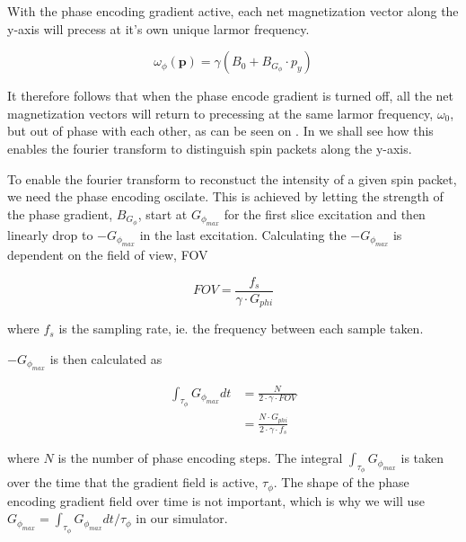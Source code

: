 With the phase encoding gradient active, each net magnetization vector
along the y-axis will precess at it's own unique larmor frequency. 

\begin{displaymath}
  \omega_\phi(\mathbf{p}) = \gamma (B_0 + B_{G_\phi} \cdot p_y)
\end{displaymath}

It therefore follows that when the phase encode gradient is turned
off, all the net magnetization vectors will return to precessing at
the same larmor frequency, $\omega_0$, but out of phase with each
other, as can be seen on . In
 we shall see how this enables the fourier
transform to distinguish spin packets along the y-axis.

To enable the fourier transform to reconstuct the intensity of a given
spin packet, we need the phase encoding oscilate. This is achieved by
letting the strength of the phase gradient, $B_{G_\phi}$, start at
$G_{\phi_{max}}$ for the first slice excitation and then linearly drop
to $-G_{\phi_{max}}$ in the last excitation. Calculating the
$-G_{\phi_{max}}$ is dependent on the field of view, FOV

\begin{displaymath}
  FOV = \frac{f_s}{\gamma \cdot G_{phi}}
\end{displaymath}

where $f_s$ is the sampling rate, ie. the frequency between each
sample taken.

$-G_{\phi_{max}}$ is then calculated as

\begin{displaymath}
  \begin{array}{rl}
    \int_{\tau_\phi} G_{\phi_{max}} dt &= \frac{N}{2 \cdot \gamma \cdot FOV}\\
    &= \frac{N \cdot G_{phi}}{2 \cdot \gamma \cdot f_s}
  \end{array}
\end{displaymath}

where $N$ is the number of phase encoding steps. The integral
$\int_{\tau_\phi} G_{\phi_{max}}$ is taken over the time that the
gradient field is active, $\tau_\phi$. The shape of the phase encoding
gradient field over time is not important, which is why we will use
$G_{\phi_{max}} = \int_{\tau_\phi} G_{\phi_{max}} dt / \tau_\phi$ in our
simulator.




